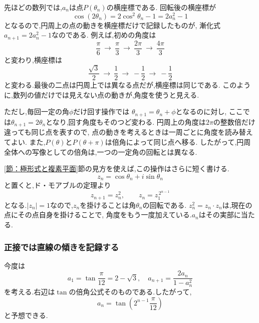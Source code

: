     \begin{center}
    \end{center}
    
    先ほどの数列では,$a_n$は点$P(\theta_n)$の横座標である.
    回転後の横座標が
    \[
      \cos(2\theta_n)=2\cos^2\theta_n-1=2a_n^2-1
    \]
    となるので,円周上の点の動きを横座標だけで記録したものが,
    漸化式$a_{n+1}=2a_n^2-1$なのである.
    例えば,初めの角度は
    \[
      \frac{\pi}{6}\ \longrightarrow\ \frac{\pi}{3}
      \ \longrightarrow\ \frac{2\pi}{3}
      \ \longrightarrow\ \frac{4\pi}{3}
    \]
    と変わり,横座標は
    \[
      \frac{\sqrt{3}}{2}\ \longrightarrow\ \frac12
      \ \longrightarrow\ -\frac12
      \ \longrightarrow\ -\frac12
    \]
    と変わる.最後の二点は円周上では異なる点だが,横座標は同じである.
    このように,数列の値だけでは見えない点の動きが,角度を使うと見える.
    
    ただし,毎回一定の角$\phi$だけ回す操作では
    $\theta_{n+1}=\theta_n+\phi$となるのに対し,
    ここでは$\theta_{n+1}=2\theta_n$となり,回す角度もそのつど変わる.
    円周上の角度は$2\pi$の整数倍だけ違っても同じ点を表すので,
    点の動きを考えるときは一周ごとに角度を読み替えてよい.
    また,$P(\theta)$と$P(\theta+\pi)$は倍角によって同じ点へ移る.
    したがって,円周全体への写像としての倍角は,一つの一定角の回転とは異なる.
    
    \ref{節：極形式と複素平面}節の見方を使えば,この操作はさらに短く書ける.
    \[
      z_n=\cos\theta_n+i\sin\theta_n
    \]
    と置くと,ド・モアブルの定理より
    \[
      z_{n+1}=z_n^2,\qquad z_n=z_1^{\,2^{n-1}}
    \]
    となる.$|z_n|=1$なので,$z_n$を掛けることは角$\theta_n$の回転である.
    $z_n^2=z_n\cdot z_n$は,現在の点にその点自身を掛けることで,
    角度をもう一度加えている.$a_n$はその実部に当たる.
    
    \subsubsection{正接では直線の傾きを記録する}\label{節：正接では直線の傾きを記録する}
    今度は
    \[
      a_1=\tan\frac{\pi}{12}=2-\sqrt{3},
      \quad
      a_{n+1}=\frac{2a_n}{1-a_n^2}
    \]
    を考える.右辺は$\tan$の倍角公式そのものである.したがって,
    \[
      a_n=\tan\left(2^{n-1}\frac{\pi}{12}\right)
    \]
    と予想できる.
    
